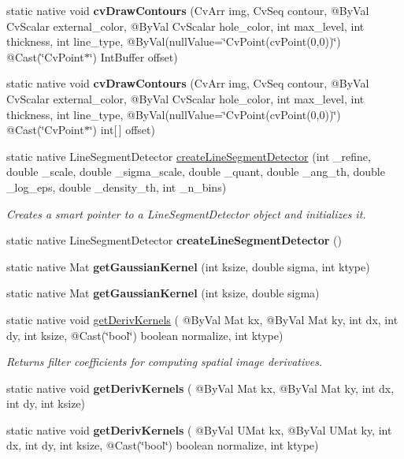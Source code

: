 \begin{DoxyCompactItemize}
\item 
static native void {\bfseries cv\+Draw\+Contours} (Cv\+Arr img, Cv\+Seq contour, @By\+Val Cv\+Scalar external\+\_\+color, @By\+Val Cv\+Scalar hole\+\_\+color, int max\+\_\+level, int thickness, int line\+\_\+type, @By\+Val(null\+Value=\char`\"{}Cv\+Point(cv\+Point(0,0))\char`\"{}) @Cast(\char`\"{}Cv\+Point$\ast$\char`\"{}) Int\+Buffer offset)
\item 
static native void {\bfseries cv\+Draw\+Contours} (Cv\+Arr img, Cv\+Seq contour, @By\+Val Cv\+Scalar external\+\_\+color, @By\+Val Cv\+Scalar hole\+\_\+color, int max\+\_\+level, int thickness, int line\+\_\+type, @By\+Val(null\+Value=\char`\"{}Cv\+Point(cv\+Point(0,0))\char`\"{}) @Cast(\char`\"{}Cv\+Point$\ast$\char`\"{}) int\mbox{[}$\,$\mbox{]} offset)
\item 
static native Line\+Segment\+Detector \hyperlink{group__imgproc__feature_ga19a371ab2269ddf309820d928394498d}{create\+Line\+Segment\+Detector} (int \+\_\+refine, double \+\_\+scale, double \+\_\+sigma\+\_\+scale, double \+\_\+quant, double \+\_\+ang\+\_\+th, double \+\_\+log\+\_\+eps, double \+\_\+density\+\_\+th, int \+\_\+n\+\_\+bins)
\begin{DoxyCompactList}\small\item\em Creates a smart pointer to a Line\+Segment\+Detector object and initializes it. \end{DoxyCompactList}\item 
static native Line\+Segment\+Detector {\bfseries create\+Line\+Segment\+Detector} ()
\item 
static native Mat {\bfseries get\+Gaussian\+Kernel} (int ksize, double sigma, int ktype)
\item 
static native Mat {\bfseries get\+Gaussian\+Kernel} (int ksize, double sigma)
\item 
static native void \hyperlink{group__imgproc__filter_ga6e163a3c7af7f53953629e3bc1a4d5ea}{get\+Deriv\+Kernels} ( @By\+Val Mat kx, @By\+Val Mat ky, int dx, int dy, int ksize, @Cast(\char`\"{}bool\char`\"{}) boolean normalize, int ktype)
\begin{DoxyCompactList}\small\item\em Returns filter coefficients for computing spatial image derivatives. \end{DoxyCompactList}\item 
static native void {\bfseries get\+Deriv\+Kernels} ( @By\+Val Mat kx, @By\+Val Mat ky, int dx, int dy, int ksize)
\item 
static native void {\bfseries get\+Deriv\+Kernels} ( @By\+Val U\+Mat kx, @By\+Val U\+Mat ky, int dx, int dy, int ksize, @Cast(\char`\"{}bool\char`\"{}) boolean normalize, int ktype)

\end{DoxyCompactItemize}
